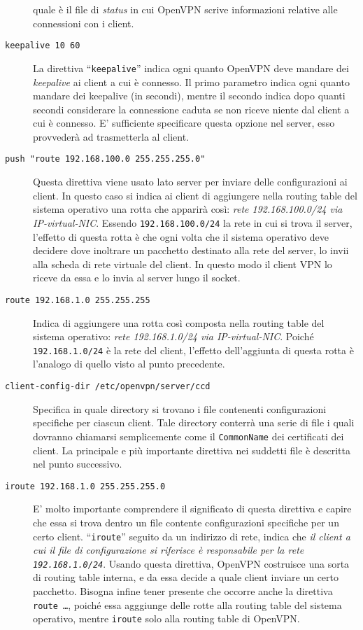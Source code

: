 \begin{description}
	quale è il file di \textit{status} in cui OpenVPN scrive informazioni relative
	alle connessioni con i client.
	\item[\texttt{keepalive 10 60}]La direttiva ``\texttt{keepalive}'' indica ogni
	quanto OpenVPN deve mandare dei \textit{keepalive} ai client a cui è connesso.
	Il primo parametro indica ogni quanto mandare dei keepalive (in secondi), mentre
	il secondo indica dopo quanti secondi considerare la connessione caduta se non riceve
	niente dal client a cui è connesso. E' sufficiente specificare questa opzione
	nel server, esso provvederà ad trasmetterla al client.
	\item[\texttt{push "route 192.168.100.0 255.255.255.0"}]Questa direttiva viene
	usato lato server per inviare delle configurazioni ai client. In questo caso si indica
	ai client di aggiungere nella routing table del sistema operativo una rotta che
	apparirà così: \textit{rete 192.168.100.0/24 via IP-virtual-NIC}. Essendo
	\texttt{192.168.100.0/24} la rete in cui si trova il server, l'effetto di questa
	rotta è che ogni volta che il sistema operativo deve decidere dove inoltrare un
	pacchetto destinato alla rete del server, lo invii alla scheda di rete virtuale
	del client. In questo modo il client VPN lo riceve da essa e lo invia al server
	lungo il socket.
	\item[\texttt{route 192.168.1.0 255.255.255}]Indica di aggiungere una rotta
	così composta nella routing table del sistema operativo: \textit{rete 192.168.1.0/24
		via IP-virtual-NIC}. Poiché \texttt{192.168.1.0/24} è la rete del client, l'effetto
	dell'aggiunta di questa rotta è l'analogo di quello visto al punto precedente.
	\item[\texttt{client-config-dir /etc/openvpn/server/ccd}]Specifica in quale
	directory si trovano i file contenenti configurazioni specifiche per ciascun client.
	Tale directory conterrà una serie di file i quali dovranno chiamarsi semplicemente
	come il \texttt{CommonName} dei certificati dei client. La principale e più
	importante direttiva nei suddetti file è descritta nel punto successivo.
	\item[\texttt{iroute 192.168.1.0 255.255.255.0}]E' molto importante comprendere
	il significato di questa direttiva e capire che essa si trova dentro un file
	contente configurazioni specifiche per un certo client. ``\texttt{iroute}'' seguito
	da un indirizzo di rete, indica che \textit{il client a cui il file di configurazione
		si riferisce è responsabile per la rete \texttt{192.168.1.0/24}}. Usando questa
	direttiva, OpenVPN costruisce una sorta di routing table interna, e da essa
	decide a quale client inviare un certo pacchetto. Bisogna infine tener presente
	che occorre anche la direttiva \texttt{route \ldots}, poiché essa agggiunge delle
	rotte alla routing table del sistema operativo, mentre \texttt{iroute} solo
	alla routing table di OpenVPN.
\end{description}


